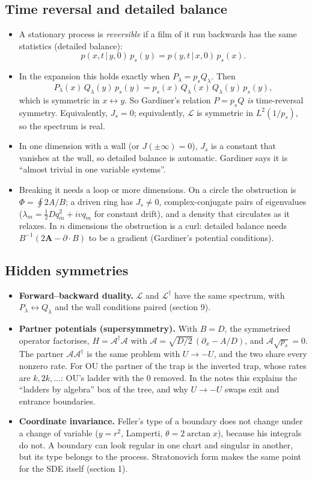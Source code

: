 \documentclass[11pt]{article}
\newcommand{\gv}{\,|\,}
\newcommand{\Lop}{\mathcal{L}}
\begin{document}
\subsection{Time reversal and detailed balance}
\begin{itemize}
  \item A stationary process is \emph{reversible} if a film of it run backwards has the same statistics
        (detailed balance):
        \[ p(x,t\gv y,0)\,p_s(y)=p(y,t\gv x,0)\,p_s(x). \]
  \item In the expansion this holds exactly when $P_\lambda=p_sQ_\lambda$. Then
        \[ P_\lambda(x)\,Q_\lambda(y)\,p_s(y)=p_s(x)\,Q_\lambda(x)\,Q_\lambda(y)\,p_s(y), \]
        which is symmetric in $x\leftrightarrow y$. So Gardiner's
        relation $P=p_sQ$ \emph{is} time-reversal symmetry. Equivalently, $J_s=0$; equivalently, $\Lop$ is symmetric in
        $L^2(1/p_s)$, so the spectrum is real.
  \item In one dimension with a wall (or $J(\pm\infty)=0$), $J_s$ is a constant that vanishes at the wall, so detailed
        balance is automatic. Gardiner says it is ``almost trivial in one variable systems''.
  \item Breaking it needs a loop or more dimensions. On a circle the obstruction is $\Phi=\oint2A/B$; a driven ring has
        $J_s\neq0$, complex-conjugate pairs of eigenvalues ($\lambda_m=\frac12Dq_m^2+ivq_m$ for constant drift), and a density
        that circulates as it relaxes. In $n$ dimensions the obstruction is a curl: detailed balance needs
        $B^{-1}(2\bm A-\partial\cdot B)$ to be a gradient (Gardiner's potential conditions).
\end{itemize}

\subsection{Hidden symmetries}
\begin{itemize}
  \item \textbf{Forward--backward duality.} $\Lop$ and $\Lop^\dagger$ have the same spectrum, with $P_\lambda\leftrightarrow
        Q_\lambda$ and the wall conditions paired (section 9).
  \item \textbf{Partner potentials (supersymmetry).} With $B=D$, the symmetrised operator factorises,
        $H=\mathcal A^\dagger\mathcal A$ with $\mathcal A=\sqrt{D/2}\,(\partial_x-A/D)$, and $\mathcal A\sqrt{p_s}=0$. The
        partner $\mathcal A\mathcal A^\dagger$ is the same problem with $U\to-U$, and the two share every nonzero rate. For
        OU the partner of the trap is the inverted trap, whose rates are $k,2k,\dots$: OU's ladder with the $0$ removed. In
        the notes this explains the ``ladders by algebra'' box of the tree, and why $U\to-U$ swaps exit and entrance
        boundaries.
  \item \textbf{Coordinate invariance.} Feller's type of a boundary does not change under a change of variable
        ($y=r^2$, Lamperti, $\theta=2\arctan x$), because his integrals do not. A boundary can look regular in one chart and
        singular in another, but its type belongs to the process. Stratonovich form makes the same point for the SDE
        itself (section 1).
\end{itemize}
\end{document}
